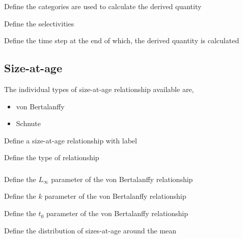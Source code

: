  {Define the categories are used to calculate the derived quantity}

 {Define the selectivities}

 {Define the time step at the end of which, the derived quantity is calculated}

\subsection{Size-at-age}

The individual types of size-at-age relationship available are, 

\begin{itemize}
	\item von Bertalanffy
	\item Schnute
\end{itemize}

 {Define a size-at-age relationship with label}

 {Define the type of relationship}

\subsubsection[von Bertalanffy]{}

 {Define the $L_\infty$ parameter of the von Bertalanffy relationship}

 {Define the $k$ parameter of the von Bertalanffy relationship}

 {Define the $t_0$ parameter of the von Bertalanffy relationship}

 {Define the distribution of sizes-at-age around the mean}

